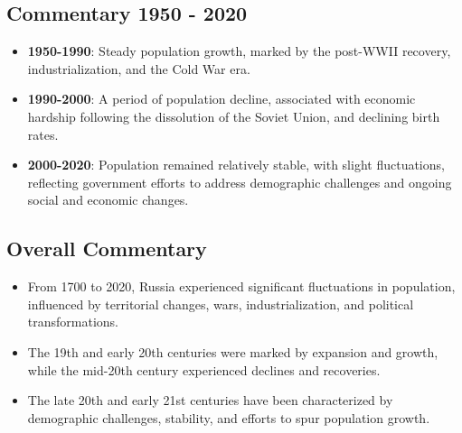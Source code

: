 \subsection*{Commentary 1950 - 2020}
\begin{itemize}
    \item \textbf{1950-1990}: Steady population growth, marked by the post-WWII recovery, industrialization, and the Cold War era.
    \item \textbf{1990-2000}: A period of population decline, associated with economic hardship following the dissolution of the Soviet Union, and declining birth rates.
    \item \textbf{2000-2020}: Population remained relatively stable, with slight fluctuations, reflecting government efforts to address demographic challenges and ongoing social and economic changes.
\end{itemize}

\subsection*{Overall Commentary}
\begin{itemize}
    \item From 1700 to 2020, Russia experienced significant fluctuations in population, influenced by territorial changes, wars, industrialization, and political transformations.
    \item The 19th and early 20th centuries were marked by expansion and growth, while the mid-20th century experienced declines and recoveries.
    \item The late 20th and early 21st centuries have been characterized by demographic challenges, stability, and efforts to spur population growth.
\end{itemize}